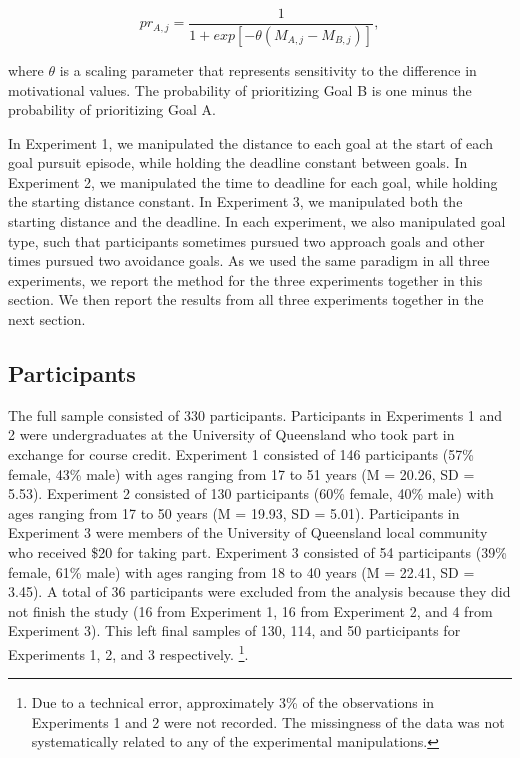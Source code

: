 \documentclass[a4paper,doc,natbib,donotrepeattitle]{apa6}
\begin{document}
\begin{equation}
pr_{A,j} = \frac{1}{1 + exp[-\theta(M_{A,j} - M_{B,j})]},
\end{equation}

\noindent where $\theta$ is a scaling parameter that represents sensitivity to the difference in motivational values. The probability of prioritizing Goal B is one minus the probability of prioritizing Goal A.

In Experiment 1, we manipulated the distance to each goal at the start of each goal pursuit episode, while holding the deadline constant between goals. In Experiment 2, we manipulated the time to deadline for each goal, while holding the starting distance constant. In Experiment 3, we manipulated both the starting distance and the deadline. In each experiment, we also manipulated goal type, such that participants sometimes pursued two approach goals and other times pursued two avoidance goals. As we used the same paradigm in all three experiments, we report the method for the three experiments together in this section. We then report the results from all three experiments together in the next section.







\subsection{Participants}

The full sample consisted of 330 participants. Participants in Experiments 1 and 2 were undergraduates at the University of Queensland who took part in exchange for course credit. Experiment 1 consisted of 146 participants (57\% female, 43\% male) with ages ranging from 17 to 51 years (M = 20.26, SD = 5.53). Experiment 2 consisted of 130 participants (60\% female, 40\% male) with ages ranging from 17 to 50 years (M = 19.93, SD = 5.01). Participants in Experiment 3 were members of the University of Queensland local community who received \$20 for taking part. Experiment 3 consisted of 54 participants (39\% female, 61\% male) with ages ranging from 18 to 40 years (M = 22.41, SD = 3.45). A total of 36 participants were excluded from the analysis because they did not finish the study (16 from Experiment 1, 16 from Experiment 2, and 4 from Experiment 3). This left final samples of 130, 114, and 50 participants for Experiments 1, 2, and 3 respectively. \footnote{Due to a technical error, approximately 3\% of the observations in Experiments 1 and 2 were not recorded. The missingness of the data was not systematically related to any of the experimental manipulations.}.
\end{document}
